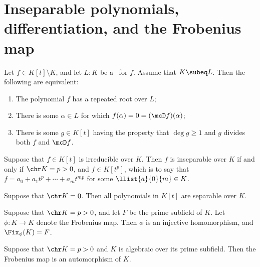 \documentclass{article}
\begin{document}
\section{Inseparable polynomials, differentiation, and the Frobenius map}
  \begin{ttheorem}
    Let \( f\in K[t]\setminus K \), and let \( L:K \) be a \sfe~for \( f \). Assume that \( K\subeq L \). Then the following are equivalent:
    \begin{enumerate}[label=(\roman*)]
      \item The polynomial \( f \) has a repeated root over \( L \);
      \item There is some \( \alpha\in L \) for which \( f(\alpha)=0=(\mcD f)(\alpha) \);
      \item There is some \( g\in K[t] \) having the property that \( \deg g\geq 1 \) and \( g \) divides both \( f \) and \( \mcD f \).
    \end{enumerate}
  \end{ttheorem}

  \begin{ttheorem}
    Suppose that \( f\in K[t] \) is irreducible over \( K \). Then \( f \) is inseparable over \( K \) if and only if \( \chr K=p>0 \), and \( f \in K[t^p] \), which is to say that \( f=a_0+a_1t^p+\cdots+a_mt^{mp} \) for some \( \llist{a}{0}{m}\in K \).
  \end{ttheorem}

  \begin{tcorollary}
    Suppose that \( \chr K = 0 \). Then all polynomials in \( K[t] \) are separable over \( K \).
  \end{tcorollary}

  \begin{ttheorem}
    Suppose that \( \chr K = p>0 \), and let \( F \) be the prime subfield of \( K \). Let \( \phi:K\to K \) denote the Frobenius map. Then \( \phi \) is an injective homomorphism, and \( \Fix_\phi(K) = F \).
  \end{ttheorem}

  \begin{tcorollary}
    Suppose that \( \chr K = p > 0 \) and \( K \) is algebraic over its prime subfield. Then the Frobenius map is an automorphism of \( K \).
  \end{tcorollary}
\end{document}
